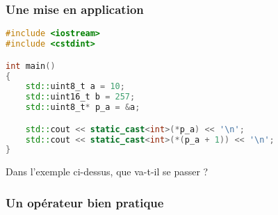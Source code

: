 \documentclass{cppcourses}
\begin{document}
\begin{frame}[fragile]

\frametitle{Une mise en application}

\begin{example}

\begin{lstlisting}[language=c++]
#include <iostream>
#include <cstdint>

int main()
{
    std::uint8_t a = 10;
    std::uint16_t b = 257;
    std::uint8_t* p_a = &a;

    std::cout << static_cast<int>(*p_a) << '\n';
    std::cout << static_cast<int>(*(p_a + 1)) << '\n';
}
\end{lstlisting}

Dans l'exemple ci-dessus, que va-t-il se passer ?


\end{example}

\end{frame}

\subsubsection{Un opérateur bien pratique}
\end{document}
